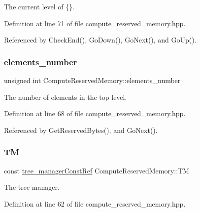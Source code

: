 The current level of \{\}. 



Definition at line 71 of file compute\+\_\+reserved\+\_\+memory.\+hpp.



Referenced by Check\+End(), Go\+Down(), Go\+Next(), and Go\+Up().

\mbox{\label{classComputeReservedMemory_a132e4e354537df8362bce88e3cb013f3}} 
\subsubsection{\texorpdfstring{elements\+\_\+number}{elements\_number}}
{\footnotesize\ttfamily unsigned int Compute\+Reserved\+Memory\+::elements\+\_\+number\hspace{0.3cm}{\ttfamily [private]}}



The number of elements in the top level. 



Definition at line 68 of file compute\+\_\+reserved\+\_\+memory.\+hpp.



Referenced by Get\+Reserved\+Bytes(), and Go\+Next().

\mbox{\label{classComputeReservedMemory_a1de84842d1f10700a780d6aea075fc89}} 
\subsubsection{\texorpdfstring{TM}{TM}}
{\footnotesize\ttfamily const \hyperlink{tree__manager_8hpp_a792e3f1f892d7d997a8d8a4a12e39346}{tree\+\_\+manager\+Const\+Ref} Compute\+Reserved\+Memory\+::\+TM\hspace{0.3cm}{\ttfamily [private]}}



The tree manager. 



Definition at line 62 of file compute\+\_\+reserved\+\_\+memory.\+hpp.



